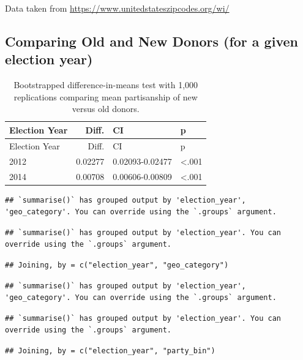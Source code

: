 \documentclass[10pt,]{article}
\begin{document}
Data taken from \url{https://www.unitedstateszipcodes.org/wi/}

\newpage

\hypertarget{comparing-old-and-new-donors-for-a-given-election-year}{%
\subsection{Comparing Old and New Donors (for a given election
year)}\label{comparing-old-and-new-donors-for-a-given-election-year}}

\begin{longtable}[]{@{}lrll@{}}
\caption{Bootstrapped difference-in-means test with 1,000 replications
comparing mean partisanship of new versus old donors.}\tabularnewline
\toprule
Election Year & Diff. & CI & p\tabularnewline
\midrule
\endfirsthead
\toprule
Election Year & Diff. & CI & p\tabularnewline
\midrule
\endhead
2012 & 0.02277 & 0.02093-0.02477 & \textless.001\tabularnewline
2014 & 0.00708 & 0.00606-0.00809 & \textless.001\tabularnewline
\bottomrule
\end{longtable}

\newpage

\begin{verbatim}
## `summarise()` has grouped output by 'election_year', 'geo_category'. You can override using the `.groups` argument.
\end{verbatim}

\begin{verbatim}
## `summarise()` has grouped output by 'election_year'. You can override using the `.groups` argument.
\end{verbatim}

\begin{verbatim}
## Joining, by = c("election_year", "geo_category")
\end{verbatim}

\begin{verbatim}
## `summarise()` has grouped output by 'election_year', 'geo_category'. You can override using the `.groups` argument.
\end{verbatim}

\begin{verbatim}
## `summarise()` has grouped output by 'election_year'. You can override using the `.groups` argument.
\end{verbatim}

\begin{verbatim}
## Joining, by = c("election_year", "party_bin")
\end{verbatim}
\end{document}

